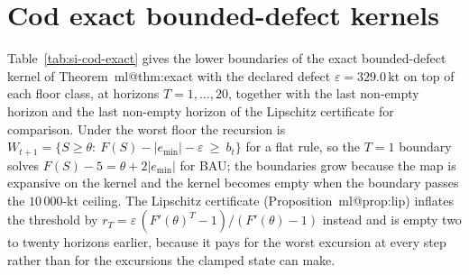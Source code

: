 \documentclass[11pt,a4paper]{article}
\makeatletter
\newcommand{\LRP}{\theta}
\newcommand{\kt}{\,\mathrm{kt}}
\newcommand{\mref}[1]{\csname ml@#1\endcsname}
\makeatother
\begin{document}
\section{Cod exact bounded-defect kernels}\label{si:cod-exact}
Table~\ref{tab:si-cod-exact} gives the lower boundaries of the exact bounded-defect kernel of Theorem~\mref{thm:exact} with the declared defect $\varepsilon=329.0\kt$ on top of each floor class, at horizons $T=1,\dots,20$, together with the last non-empty horizon and the last non-empty horizon of the Lipschitz certificate for comparison. Under the worst floor the recursion is $W_{t+1}=\{S\ge\LRP:\ F(S)-|e_{\min}|-\varepsilon\ \ge\ b_t\}$ for a flat rule, so the $T=1$ boundary solves $F(S)-5=\LRP+2|e_{\min}|$ for BAU; the boundaries grow because the map is expansive on the kernel and the kernel becomes empty when the boundary passes the $10\,000$-kt ceiling. The Lipschitz certificate (Proposition~\mref{prop:lip}) inflates the threshold by $r_T=\varepsilon\,(F'(\LRP)^T-1)/(F'(\LRP)-1)$ instead and is empty two to twenty horizons earlier, because it pays for the worst excursion at every step rather than for the excursions the clamped state can make.
\begingroup\scriptsize\setlength{\tabcolsep}{3pt}
\end{document}
